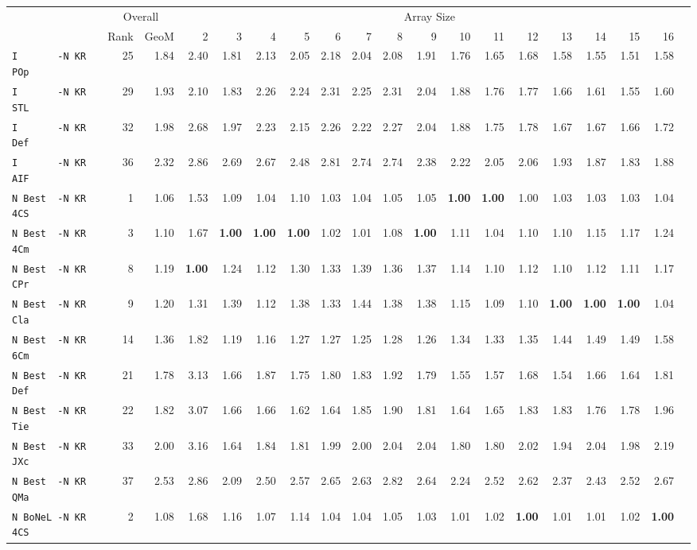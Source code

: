 \begin{tabular}{l | r @{~~} r | r@{~~}r@{~~}r@{~~}r@{~~}r@{~~}r@{~~}r@{~~}r@{~~}r@{~~}r@{~~}r@{~~}r@{~~}r@{~~}r@{~~}r@{~~}r|}
 & \multicolumn{2}{c|}{Overall} & \multicolumn{15}{c}{Array Size} \\
 & Rank & GeoM & 2&3&4&5&6&7&8&9&10&11&12&13&14&15&16\\ \hline
\verb+I       -N KR POp+ & 25 & 1.84 & 2.40&1.81&2.13&2.05&2.18&2.04&2.08&1.91&1.76&1.65&1.68&1.58&1.55&1.51&1.58\\
\verb+I       -N KR STL+ & 29 & 1.93 & 2.10&1.83&2.26&2.24&2.31&2.25&2.31&2.04&1.88&1.76&1.77&1.66&1.61&1.55&1.60\\
\verb+I       -N KR Def+ & 32 & 1.98 & 2.68&1.97&2.23&2.15&2.26&2.22&2.27&2.04&1.88&1.75&1.78&1.67&1.67&1.66&1.72\\
\verb+I       -N KR AIF+ & 36 & 2.32 & 2.86&2.69&2.67&2.48&2.81&2.74&2.74&2.38&2.22&2.05&2.06&1.93&1.87&1.83&1.88\smallskip \\
\verb+N Best  -N KR 4CS+ & 1 & 1.06 & 1.53&1.09&1.04&1.10&1.03&1.04&1.05&1.05&\textbf{1.00}&\textbf{1.00}&1.00&1.03&1.03&1.03&1.04\\
\verb+N Best  -N KR 4Cm+ & 3 & 1.10 & 1.67&\textbf{1.00}&\textbf{1.00}&\textbf{1.00}&1.02&1.01&1.08&\textbf{1.00}&1.11&1.04&1.10&1.10&1.15&1.17&1.24\\
\verb+N Best  -N KR CPr+ & 8 & 1.19 & \textbf{1.00}&1.24&1.12&1.30&1.33&1.39&1.36&1.37&1.14&1.10&1.12&1.10&1.12&1.11&1.17\\
\verb+N Best  -N KR Cla+ & 9 & 1.20 & 1.31&1.39&1.12&1.38&1.33&1.44&1.38&1.38&1.15&1.09&1.10&\textbf{1.00}&\textbf{1.00}&\textbf{1.00}&1.04\\
\verb+N Best  -N KR 6Cm+ & 14 & 1.36 & 1.82&1.19&1.16&1.27&1.27&1.25&1.28&1.26&1.34&1.33&1.35&1.44&1.49&1.49&1.58\\
\verb+N Best  -N KR Def+ & 21 & 1.78 & 3.13&1.66&1.87&1.75&1.80&1.83&1.92&1.79&1.55&1.57&1.68&1.54&1.66&1.64&1.81\\
\verb+N Best  -N KR Tie+ & 22 & 1.82 & 3.07&1.66&1.66&1.62&1.64&1.85&1.90&1.81&1.64&1.65&1.83&1.83&1.76&1.78&1.96\\
\verb+N Best  -N KR JXc+ & 33 & 2.00 & 3.16&1.64&1.84&1.81&1.99&2.00&2.04&2.04&1.80&1.80&2.02&1.94&2.04&1.98&2.19\\
\verb+N Best  -N KR QMa+ & 37 & 2.53 & 2.86&2.09&2.50&2.57&2.65&2.63&2.82&2.64&2.24&2.52&2.62&2.37&2.43&2.52&2.67\smallskip \\
\verb+N BoNeL -N KR 4CS+ & 2 & 1.08 & 1.68&1.16&1.07&1.14&1.04&1.04&1.05&1.03&1.01&1.02&\textbf{1.00}&1.01&1.01&1.02&\textbf{1.00}\\

\end{tabular}
